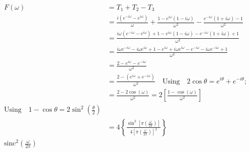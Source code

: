 \documentclass[preview]{standalone}
\begin{document}
\begin{align*}
F(\omega)&=T_{1}+T_{2}-T_{3} \\ &=\frac{i(e^{-i\omega}-e^{i\omega})}{\omega}+\frac{1-e^{i\omega}(1-i\omega)}{\omega^{2}}-\frac{e^{-i\omega}(1+i\omega)-1}{\omega^{2}} \\ &=\frac{i\omega(e^{-i\omega}-e^{i\omega})+1-e^{i\omega}(1-i\omega)-e^{-i\omega}(1+i\omega)+1}{\omega^{2}} \\ &=\frac{i\omega e^{-i\omega}-i\omega e^{i\omega}+1-e^{i\omega}+i\omega e^{i\omega}-e^{-i\omega}-i\omega e^{-i\omega}+1}{\omega^{2}} \\ &=\frac{2-e^{i\omega} - e^{-i\omega}}{\omega^{2}} \\ &=\frac{2-(e^{i\omega}+e^{-i\omega})}{\omega^{2}} \quad \textrm{Using} \quad 2\cos{\theta} =e^{i\theta}+e^{-i\theta}; \\ &=\frac{2-2\cos{(\omega)}}{\omega^{2}} = 2\left[\frac{1-\cos{(\omega)}}{\omega^{2}}\right] \\ \textrm{Using} \quad 1-\cos{\theta}=2\sin^{2}{\left( \frac{\theta}{2} \right) } \\ &=4\left\{ \frac{\sin^{2}{\left[ \pi \left( \frac{\omega}{2\pi} \right) \right]}}{4\left[ \pi \left( \frac{\omega}{2\pi} \right) \right]^{2} } \right\} \\ \textrm{sinc}^{2}\left( \frac{\omega}{2\pi} \right)
\end{align*}
\end{document}

